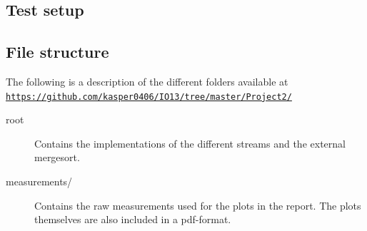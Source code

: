 \documentclass[a4paper,12pt]{article}
\begin{document}
\subsection{Test setup}


\subsection{File structure}
The following is a description of the different folders available at
\\
\texttt{\url{https://github.com/kasper0406/IO13/tree/master/Project2/}}
\begin{description}
\item[root] Contains the implementations of the different streams and
  the external mergesort.

\item[measurements/] Contains the raw measurements used for the plots in the
  report. The plots themselves are also included in a pdf-format.
\end{description}
\end{document}
